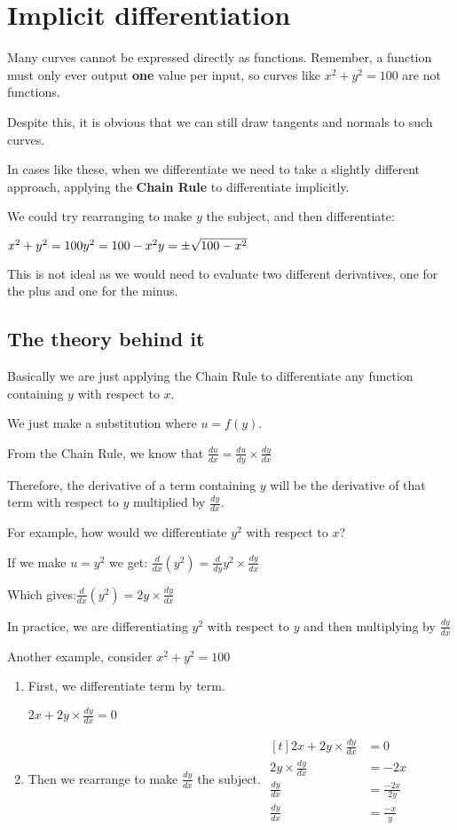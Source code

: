 \documentclass[../main.tex]{subfiles}
\begin{document}
\section{Implicit differentiation}
Many curves cannot be expressed directly as functions. Remember, a function must only ever output \textbf{one} value per input, so curves like \(x^2+y^2=100\) are not functions.

Despite this, it is obvious that we can still draw tangents and normals to such curves.

In cases like these, when we differentiate we need to take a slightly different approach, applying the \textbf{Chain Rule} to differentiate implicitly.

We could try rearranging to make \(y\) the subject, and then differentiate:

\(x^2+y^2=100\\
y^2=100-x^2\\
y=\pm\sqrt{100-x^2}\)

This is not ideal as we would need to evaluate two different derivatives, one for the plus and one for the minus.

\subsection*{The theory behind it}
Basically we are just applying the Chain Rule to differentiate any function containing \(y\) with respect to \(x\).

We just make a substitution where \(u = f(y)\).

From the Chain Rule, we know that \(\frac{du}{dx}=\frac{du}{dy}\times\frac{dy}{dx}\)

Therefore, the derivative of a term containing \(y\) will be the derivative of that term with respect to \(y\) multiplied by \(\frac{dy}{dx}\).

For example, how would we differentiate \(y^2\) with respect to \(x\)?

If we make \(u=y^2\) we get:
\(\frac{d}{dx}(y^2)=\frac{d}{dy}y^2\times\frac{dy}{dx}\)

Which gives:\(\frac{d}{dx}(y^2)=2y\times\frac{dy}{dx}\)

In practice, we are differentiating \(y^2\) with respect to \(y\) and then multiplying by \(\frac{dy}{dx}\)

Another example, consider \(x^2+y^2=100\)
\begin{enumerate}
    \item First, we differentiate term by term.
    
    \( 2x + 2y\times\frac{dy}{dx}=0\)

    \item Then we rearrange to make \(\frac{dy}{dx}\) the subject.
    $
    \!
    \begin{aligned}[t]
     2x + 2y\times\frac{dy}{dx}
        &= 0 \\
     2y\times\frac{dy}{dx}
        &= -2x \\
    \frac{dy}{dx}
        &= \frac{-2x}{2y} \\
    \frac{dy}{dx}
        &= \frac{-x}{y}
    \end{aligned}
    $
\end{enumerate}
\end{document}
